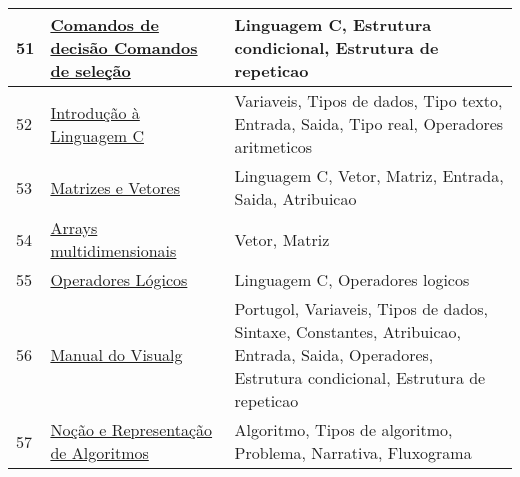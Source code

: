 \begin{longtable}{| p{} | p{} | p{} |}
51  & \href{http://www.inf.pucrs.br/~pinho/LaproI/ComandosDeRepeticao/Repeticao.html}{\color{blue} Comandos de decisão Comandos de seleção                                             } & Linguagem C, Estrutura condicional, Estrutura de repeticao                                                                                        \\ \hline
52  & \href{http://www.inf.pucrs.br/~pinho/LaproI/IntroC/IntroC.htm}{\color{blue} Introdução à Linguagem C                                                            } & Variaveis, Tipos de dados, Tipo texto, Entrada, Saida, Tipo real, Operadores aritmeticos                                                          \\ \hline
53  & \href{http://www.inf.pucrs.br/~pinho/LaproI/Vetores/Vetores.htm}{\color{blue} Matrizes e Vetores                                                                  } & Linguagem C, Vetor, Matriz, Entrada, Saida, Atribuicao                                                                                            \\ \hline
54  & \href{http://www.inf.ufpr.br/cursos/ci067/Docs/NotasAula/notas-19\_Arrays\_Multidimensionais.html}{\color{blue} Arrays multidimensionais                                                            } & Vetor, Matriz                                                                                                                                     \\ \hline
55  & \href{http://www.inf.ufpr.br/cursos/ci067/Docs/NotasAula/notas-6\_Operadores\_Logicos.html}{\color{blue} Operadores Lógicos                                                                  } & Linguagem C, Operadores logicos                                                                                                                   \\ \hline
56  & \href{http://www.inf.ufsc.br/~bosco/ensino/ine5201/ApostilaVisuAlg20.pdf}{\color{blue} Manual do Visualg                                                                   } & Portugol, Variaveis, Tipos de dados, Sintaxe, Constantes, Atribuicao, Entrada, Saida, Operadores, Estrutura condicional, Estrutura de repeticao   \\ \hline
57  & \href{http://www.ipb.pt/~cmca/algor1.pdf}{\color{blue} Noção e Representação de Algoritmos                                                 } & Algoritmo, Tipos de algoritmo, Problema, Narrativa, Fluxograma                                                                                    \\ \hline

\end{longtable}
